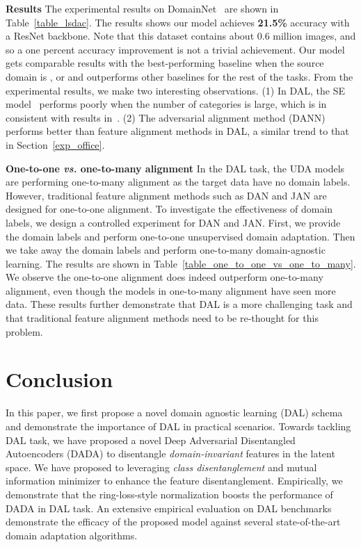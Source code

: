 \documentclass{article}
\newcommand{\BV}[1]{\color{black!10!blue}{\em #1}}
\begin{document}
\textbf{Results} The experimental results on DomainNet~\cite{domainnet} are shown in Table~\ref{table_lsdac}. The results shows our model achieves \textbf{21.5\%} accuracy with a ResNet backbone. Note that this dataset contains about 0.6 million images, and so a one percent accuracy improvement is not a trivial achievement. Our model gets comparable results with the best-performing baseline when the source domain is {\BV{pnt}}, or {\BV{qdr}} and outperforms other baselines for the rest of the tasks. From the experimental results, we make two interesting observations. (1) In DAL, the SE model~\cite{SE} performs poorly when the number of categories is large, which is in consistent with results in~\cite{domainnet}. (2) The adversarial alignment method (DANN) performs better than feature alignment methods in DAL, a similar trend to that in Section~\ref{exp_office}.

\textbf{One-to-one \textit{vs.} one-to-many alignment} In the DAL task, the UDA models are performing one-to-many alignment as the target data have no domain labels. However, traditional feature alignment methods such as DAN and JAN are designed for one-to-one alignment. To investigate the effectiveness of domain labels, we design a controlled experiment for DAN and JAN. First, we provide the domain labels and perform one-to-one unsupervised domain adaptation. Then we take away the domain labels and perform one-to-many domain-agnostic learning. The results are shown in Table~\ref{table_one_to_one_vs_one_to_many}. We observe the one-to-one alignment does indeed outperform one-to-many alignment, even though the models in one-to-many alignment have seen more data. These results further demonstrate that DAL is a more challenging task and that traditional feature alignment methods need to be re-thought for this problem. \section{Conclusion}
In this paper, we first propose a novel domain agnostic learning (DAL) schema and demonstrate the importance of DAL in practical scenarios. Towards tackling DAL task, we have proposed a novel Deep Adversarial Disentangled Autoencoders (DADA) to disentangle \textit{domain-invariant} features in the latent space. 
We have proposed to leveraging \textit{class disentanglement} and mutual information minimizer to enhance the feature disentanglement. Empirically, we demonstrate that the ring-loss-style normalization boosts the performance of DADA in DAL task. An extensive empirical evaluation on DAL benchmarks demonstrate the efficacy of the proposed model against several state-of-the-art domain adaptation algorithms.
\end{document}

